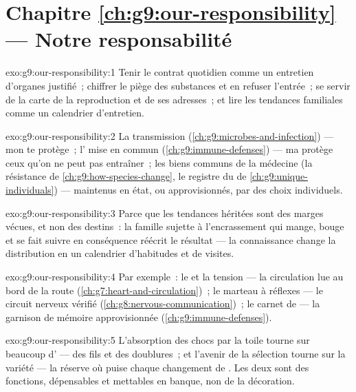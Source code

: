 \section*{Chapitre \ref{ch:g9:our-responsibility} --- Notre responsabilité}

\begin{solution}{exo:g9:our-responsibility:1}
Tenir le contrat quotidien comme un entretien d'organes
justifié~; chiffrer le piège des substances et en refuser
l'entrée~; se servir de la carte de la reproduction et de
ses adresses~; et lire les tendances familiales comme un
calendrier d'entretien.
\end{solution}

\begin{solution}{exo:g9:our-responsibility:2}
La transmission (\cref{ch:g9:microbes-and-infection}) ---
mon  te protège~; l' mise en commun
(\cref{ch:g9:immune-defenses}) --- ma  protège
ceux qu'on ne peut pas entraîner~; les biens communs de la
médecine (la résistance de
\cref{ch:g9:how-species-change}, le registre du  de
\cref{ch:g9:unique-individuals}) --- maintenus en état, ou
approvisionnés, par des choix individuels.
\end{solution}

\begin{solution}{exo:g9:our-responsibility:3}
Parce que les tendances héritées sont des marges vécues, et
non des destins~: la famille sujette à l'encrassement qui
mange, bouge et se fait suivre en conséquence réécrit le
résultat --- la connaissance change la distribution en un
calendrier d'habitudes et de visites.
\end{solution}

\begin{solution}{exo:g9:our-responsibility:4}
Par exemple~: le  et la tension --- la circulation lue
au bord de la route (\cref{ch:g7:heart-and-circulation})~;
le marteau à réflexes --- le circuit nerveux vérifié
(\cref{ch:g8:nervous-communication})~; le carnet de
 --- la garnison de mémoire approvisionnée
(\cref{ch:g9:immune-defenses}).
\end{solution}

\begin{solution}{exo:g9:our-responsibility:5}
L'absorption des chocs par la toile tourne sur beaucoup
d' --- des fils et des doublures~; et l'avenir de la
sélection tourne sur la variété --- la réserve où puise
chaque changement de . Les deux sont des
fonctions, dépensables et mettables en banque, non de la
décoration.
\end{solution}

